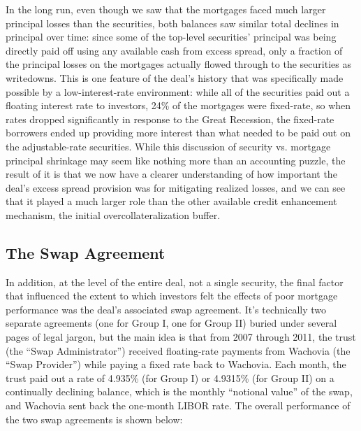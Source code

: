 \documentclass[12pt]{article}
\begin{document}
In the long run, even though we saw that the mortgages faced much larger principal losses than the securities, both balances saw similar total declines in principal over time: since some of the top-level securities’ principal was being directly paid off using any available cash from excess spread, only a fraction of the principal losses on the mortgages actually flowed through to the securities as writedowns. This is one feature of the deal’s history that was specifically made possible by a low-interest-rate environment: while all of the securities paid out a floating interest rate to investors, 24\% of the mortgages were fixed-rate, so when rates dropped significantly in response to the Great Recession, the fixed-rate borrowers ended up providing more interest than what needed to be paid out on the adjustable-rate securities. While this discussion of security vs. mortgage principal shrinkage may seem like nothing more than an accounting puzzle, the result of it is that we now have a clearer understanding of how important the deal’s excess spread provision was for mitigating realized losses, and we can see that it played a much larger role than the other available credit enhancement mechanism, the initial overcollateralization buffer.


\subsection*{The Swap Agreement}

In addition, at the level of the entire deal, not a single security, the final factor that influenced the extent to which investors felt the effects of poor mortgage performance was the deal’s associated swap agreement. It’s technically two separate agreements (one for Group I, one for Group II) buried under several pages of legal jargon, but the main idea is that from 2007 through 2011, the trust (the “Swap Administrator”) received floating-rate payments from Wachovia (the “Swap Provider”) while paying a fixed rate back to Wachovia. Each month, the trust paid out a rate of 4.935\% (for Group I) or 4.9315\% (for Group II) on a continually declining balance, which is the monthly “notional value” of the swap, and Wachovia sent back the one-month LIBOR rate. The overall performance of the two swap agreements is shown below:
\end{document}
